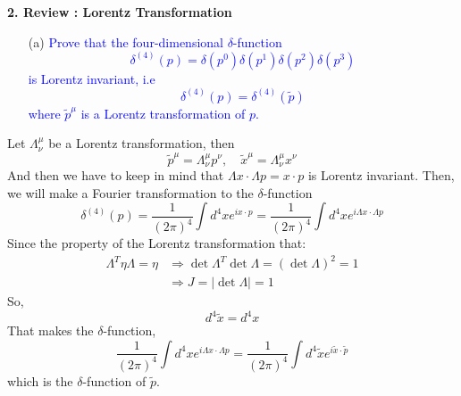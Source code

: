 \documentclass[11pt, a4paper]{article}
\begin{document}
\textbf{2. Review : Lorentz Transformation}
\begin{enumerate}
    \item [(a)] \textcolor{blue}{
    Prove that the four-dimensional $\delta$-function
    \begin{equation}\label{eqn:2.1}
        \delta^{(4)}(p) = \delta(p^0)\delta(p^1)\delta(p^2)\delta(p^3)
    \end{equation}
    is Lorentz invariant, i.e
    \begin{equation}\label{eqn:2.2}
        \delta^{(4)}(p) = \delta^{(4)}(\tilde{p})
    \end{equation}
    where $\tilde{p}^\mu$ is a Lorentz transformation of $p$.
    }
\end{enumerate}
Let $\Lambda^\mu_\nu$ be a Lorentz transformation, then
\begin{equation}
      \tilde{p}^\mu = \Lambda^\mu_\nu p^\nu, \quad \tilde{x}^\mu = \Lambda^\mu_\nu x^\nu
\end{equation}
And then we have to keep in mind that $\Lambda x \cdot \Lambda p = x \cdot p$ is Lorentz invariant.
Then, we will make a Fourier transformation to the $\delta$-function
\begin{equation}
    \delta^{(4)}(p) = \frac{1}{(2\pi)^4} \int d^4 x e^{i x \cdot p} =  \frac{1}{(2\pi)^4} \int d^4 x e^{i \Lambda x \cdot \Lambda p}
\end{equation}
Since the property of the Lorentz transformation that:
\begin{align}
    \Lambda^T \eta \Lambda = \eta & \Rightarrow \det \Lambda^T \det \Lambda = (\det \Lambda)^2 = 1 \\
    & \Rightarrow J = |\det \Lambda| = 1
\end{align}
So,
\begin{equation}
    d^4\tilde{x} = d^4 x
\end{equation}
That makes the $\delta$-function,
\begin{equation}
     \frac{1}{(2\pi)^4} \int d^4 x e^{i \Lambda x \cdot \Lambda p} =  \frac{1}{(2\pi)^4} \int d^4 \tilde{x} e^{i \tilde{x} \cdot \tilde{p}}
\end{equation}
which is the $\delta$-function of $\tilde{p}$.
\end{document}
